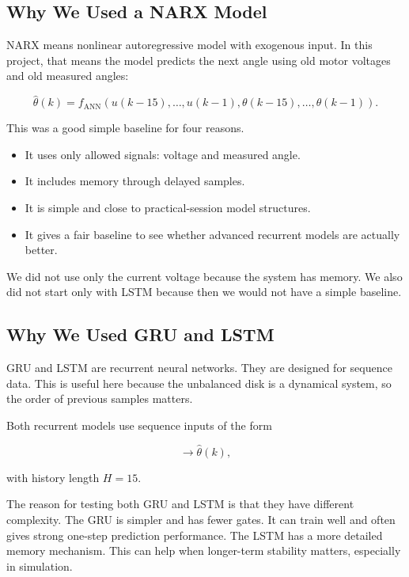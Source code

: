 \documentclass[11pt,a4paper]{article}
\begin{document}
\subsection{Why We Used a NARX Model}

NARX means nonlinear autoregressive model with exogenous input.
In this project, that means the model predicts the next angle using old motor voltages and old measured angles:

\begin{equation}
\hat{\theta}(k) =
f_{\mathrm{ANN}}(u(k-15), \ldots, u(k-1),
\theta(k-15), \ldots, \theta(k-1)).
\end{equation}

This was a good simple baseline for four reasons.

\begin{itemize}
    \item It uses only allowed signals: voltage and measured angle.
    \item It includes memory through delayed samples.
    \item It is simple and close to practical-session model structures.
    \item It gives a fair baseline to see whether advanced recurrent models are actually better.
\end{itemize}

We did not use only the current voltage because the system has memory.
We also did not start only with LSTM because then we would not have a simple baseline.

\subsection{Why We Used GRU and LSTM}

GRU and LSTM are recurrent neural networks.
They are designed for sequence data.
This is useful here because the unbalanced disk is a dynamical system, so the order of previous samples matters.

Both recurrent models use sequence inputs of the form

\begin{equation}
[(u(k-H),\theta(k-H)), \ldots, (u(k-1),\theta(k-1))]
\rightarrow \hat{\theta}(k),
\end{equation}

with history length $H=15$.

The reason for testing both GRU and LSTM is that they have different complexity.
The GRU is simpler and has fewer gates.
It can train well and often gives strong one-step prediction performance.
The LSTM has a more detailed memory mechanism.
This can help when longer-term stability matters, especially in simulation.
\end{document}
